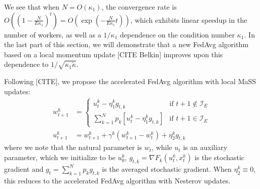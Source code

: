 We see that when $N=O(\kappa_{1})$, the convergence rate is $O((1-\frac{N}{E\kappa_{1}})^{t})=O(\exp(-\frac{N}{E\kappa_{1}}t))$,
which exhibits linear speedup in the number of workers, as well as
a $1/\kappa_{1}$ dependence on the condition number $\kappa_{1}$.
In the last part of this section, we will demonstrate that a new FedAvg
algorithm based on a local momentum update {[}CITE Belkin{]} improves
upon this dependence to $1/\sqrt{\kappa_{1}\tilde{\kappa}}$. 

Following {[}CITE{]}, we propose the accelerated FedAvg algorithm
with local MaSS updates: 
\begin{align*}
w_{t+1}^{k} & =\begin{cases}
u_{t}^{k}-\eta_{1}^{k}g_{t,k} & \text{if }t+1\notin\mathcal{I}_{E}\\
\sum_{k=1}^{N}p_{k}\left[u_{t}^{k}-\eta_{1}^{k}g_{t,k}\right] & \text{if }t+1\in\mathcal{I}_{E}
\end{cases}\\
u_{t+1}^{k} & =w_{t+1}^{k}+\gamma^{k}(w_{t+1}^{k}-w_{t}^{k})+\eta_{2}^{k}g_{t,k}
\end{align*}
where we note that the natural parameter is $w_{t}$, while $u_{t}$
is an auxiliary parameter, which we initialize to be $u_{0}^{k}$,
$g_{t,k}=\nabla F_{k}(u_{t}^{k},x_{t}^{k})$ is the stochastic gradient
and $g_{t}=\sum_{k=1}^{N}p_{k}g_{t,k}$ is the averaged stochastic
gradient. When $\eta_{2}^{k}\equiv0$, this reduces to the accelerated
FedAvg algorithm with Nesterov updates.
